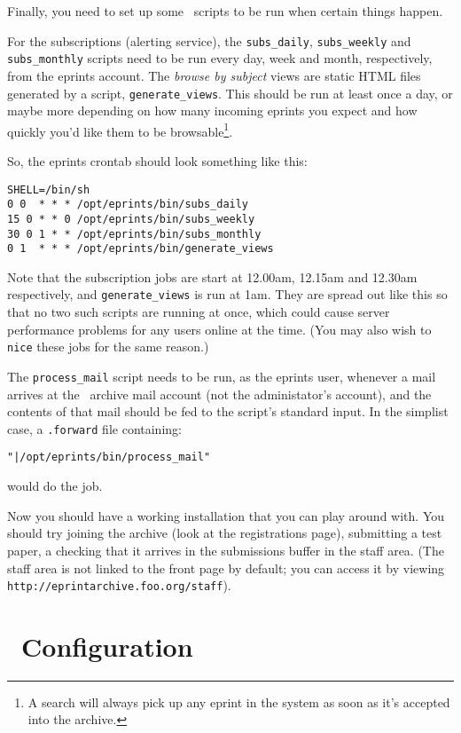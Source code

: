 {Finally, you need to set up some \eprints\ scripts to be run when certain things happen.

For the subscriptions (alerting service), the {\tt subs\_daily}, {\tt subs\_weekly} and {\tt subs\_monthly} scripts need to be run every day, week and month, respectively, from the eprints account. The \emph{browse by subject} views are static HTML files generated by a script, {\tt generate\_views}. This should be run at least once a day, or maybe more depending on how many incoming eprints you expect and how quickly you'd like them to be browsable\footnote{A search will always pick up any eprint in the system as soon as it's accepted into the archive.}.

So, the eprints crontab should look something like this:

\begin{verbatim}
SHELL=/bin/sh
0 0  * * * /opt/eprints/bin/subs_daily
15 0 * * 0 /opt/eprints/bin/subs_weekly
30 0 1 * * /opt/eprints/bin/subs_monthly
0 1  * * * /opt/eprints/bin/generate_views
\end{verbatim}

Note that the subscription jobs are start at 12.00am, 12.15am and 12.30am respectively, and {\tt generate\_views} is run at 1am. They are spread out like this so that no two such scripts are running at once, which could cause server performance problems for any users online at the time. (You may also wish to {\tt nice} these jobs for the same reason.)

The {\tt process\_mail} script needs to be run, as the eprints user, whenever a mail arrives at the \eprints\ archive mail account (not the administator's account), and the contents of that mail should be fed to the script's standard input. In the simplist case, a {\tt .forward} file containing:

\begin{verbatim}
"|/opt/eprints/bin/process_mail"
\end{verbatim}

would do the job.

Now you should have a working installation that you can play around with. You should try joining the archive (look at the registrations page), submitting a test paper, a checking that it arrives in the submissions buffer in the staff area. (The staff area is not linked to the front page by default; you can access it by viewing {\tt http://eprintarchive.foo.org/staff}).


\section{\eprints\ Configuration}
\label{install_configure}

}
